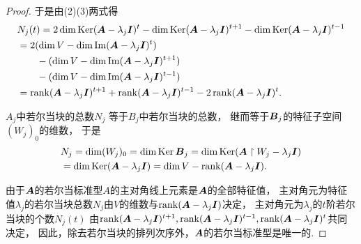 \begin{theorem}
\begin{proof}
于是由(2)(3)两式得\begin{align*}
	&N_j(t)
	= 2\dim\Ker\EpAj[t]
		- \dim\Ker\EpAj[t+1]
		- \dim\Ker\EpAj[t-1] \\
	&= 2(\dim V-\dim\Img\EpAj[t]) \\
		&\hspace{20pt} - (\dim V-\dim\Img\EpAj[t+1]) \\
		&\hspace{20pt} - (\dim V-\dim\Img\EpAj[t-1]) \\
	&= \rank\EpAj[t+1]
		+ \rank\EpAj[t-1]
		- 2\rank\EpAj[t].
\end{align*}

\(A_j\)中若尔当块的总数\(N_j\)
等于\(B_j\)中若尔当块的总数，
继而等于\(\boldsymbol{B}_j\)的特征子空间\((W_j)_0\)的维数，
于是\begin{align*}
	&N_j
	= \dim(W_j)_0
	= \dim\Ker\vb{B}_j
	= \dim\Ker\RepAj \\
	&= \dim\Ker\EpAj
	= \dim V - \rank\EpAj.
\end{align*}

由于\(\boldsymbol{A}\)的若尔当标准型\(A\)的主对角线上元素是\(\boldsymbol{A}\)的全部特征值，
主对角元为特征值\(\lambda_j\)的若尔当块总数\(N_j\)由\(V\)的维数与\(\rank\EpAj\)决定，
主对角元为\(\lambda_j\)的\(t\)阶若尔当块的个数\(N_j(t)\)
由\(\rank\EpAj[t+1],\rank\EpAj[t-1],\rank\EpAj[t]\)共同决定，
因此，除去若尔当块的排列次序外，\(\boldsymbol{A}\)的若尔当标准型是唯一的.
\end{proof}
\end{theorem}
